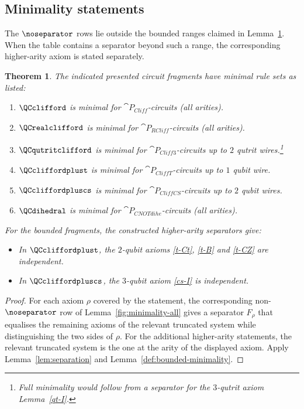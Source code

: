\documentclass[10pt,a4paper]{article}
\newtheorem{theorem}{Theorem}
\def\cref#1{Lemma~\ref{#1}}%
\begin{document}
\subsection{Minimality statements}

The \(\noseparator\) rows lie outside the bounded ranges claimed in \cref{thm:minimality-all}.  When
the table contains a separator beyond such a range, the corresponding higher-arity axiom is stated
separately.

\begin{theorem}\label{thm:minimality-all}
The indicated presented circuit fragments have minimal rule sets as listed:
\begin{enumerate}
\item \(\QCclifford\) is minimal for \(\cat{P}_{\mathit{Cliff}}\)-circuits (all arities).
\item \(\QCrealclifford\) is minimal for \(\cat{P}_{\mathit{RCliff}}\)-circuits (all arities).
\item \(\QCqutritclifford\) is minimal for \(\cat{P}_{\mathit{Cliff3}}\)-circuits up to \(2\) qutrit wires.\footnote{Full minimality would follow from a separator for the \(3\)-qutrit axiom \cref{qt-I}.}
\item \(\QCcliffordplust\) is minimal for \(\cat{P}_{\mathit{CliffT}}\)-circuits up to \(1\) qubit wire.
\item \(\QCcliffordpluscs\) is minimal for \(\cat{P}_{\mathit{CliffCS}}\)-circuits up to \(2\) qubit wires.
\item \(\QCdihedral\) is minimal for \(\cat{P}_{\mathit{CNOTdihe}}\)-circuits (all arities).
\end{enumerate}

For the bounded fragments, the constructed higher-arity separators give:
\begin{itemize}
\item In \(\QCcliffordplust\), the \(2\)-qubit axioms \eqref{t-Ct}, \eqref{t-B} and \eqref{t-CZ}
      are independent.
\item In \(\QCcliffordpluscs\), the \(3\)-qubit axiom \eqref{cs-I} is independent.
\end{itemize}
\end{theorem}

\begin{proof}
For each axiom \(\rho\) covered by the statement, the corresponding non-\(\noseparator\) row of
\cref{fig:minimality-all} gives a separator \(F_\rho\) that equalises the
remaining axioms of the relevant truncated system while distinguishing the two sides of \(\rho\).
For the additional higher-arity statements, the relevant truncated system is the one at the arity of
the displayed axiom.  Apply \cref{lem:separation} and
\cref{def:bounded-minimality}.
\end{proof}
\end{document}
